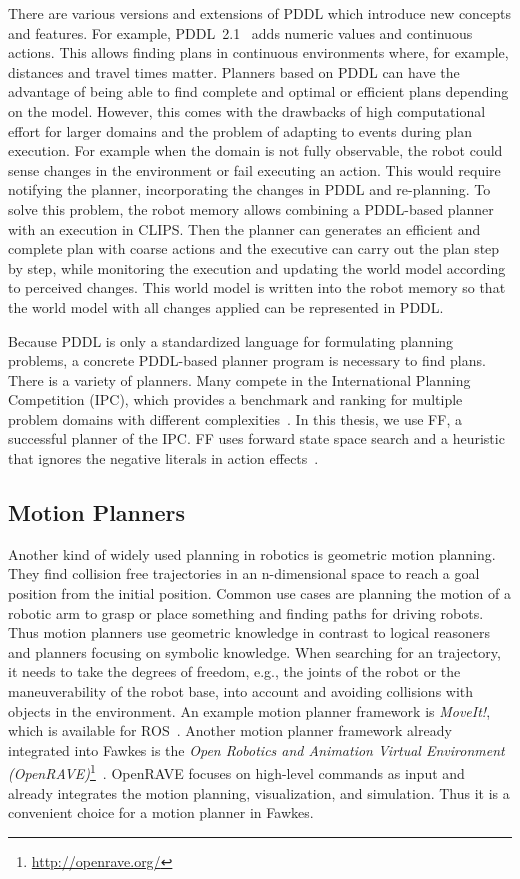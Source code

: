 There are various versions and extensions of PDDL which introduce new
concepts and features. For example, PDDL~2.1~\cite{PDDL2.1} adds
numeric values and continuous actions. This allows finding plans in
continuous environments where, for example, distances and travel times
matter. Planners based on PDDL can have the advantage of being able to find complete and
optimal or efficient plans depending on the model. However, this comes
with the drawbacks of high computational effort for larger domains and
the problem of adapting to events during plan execution. For example
when the domain is not fully observable, the robot could sense changes
in the environment or fail executing an action. This would require
notifying the planner, incorporating the changes in PDDL and
re-planning. To solve this problem, the robot memory allows
combining a PDDL-based planner with an execution in CLIPS. Then the
planner can generates an
efficient and complete plan with coarse actions and the executive can
carry out the plan step by step, while monitoring the execution and updating
the world model according to perceived changes. This world model is
written into the robot memory so that the world model with all changes
applied can be represented in PDDL.

Because PDDL is only a standardized language for formulating planning
problems, a concrete PDDL-based planner program is necessary to find plans. There
is a variety of planners. Many compete in the International
Planning Competition (IPC), which provides a benchmark and ranking for
multiple problem domains with different
complexities~\cite{planning-competition}. In this thesis, we use FF, a successful
planner of the IPC. FF uses
forward state space search and a heuristic that ignores the negative
literals in action effects~\cite{hoffmannFF}.

\subsection{Motion Planners}
Another kind of widely used planning in robotics is geometric motion
planning. They find collision free trajectories in an n-dimensional
space to reach a goal position from the initial position. Common use cases
are planning the motion of a robotic arm to grasp or place something
and finding paths for driving robots. Thus motion planners use geometric
knowledge in contrast to logical reasoners and planners focusing on
symbolic knowledge.  When searching for an trajectory, it needs to take the degrees of
freedom, e.g., the joints of the robot or the maneuverability of the
robot base, into account and avoiding collisions with objects in the
environment. An example motion planner framework is \emph{MoveIt!},
which is available for ROS~\cite{MoveIt}. Another motion planner
framework already integrated into Fawkes is the \emph{Open Robotics
  and Animation Virtual Environment
  (OpenRAVE)}\footnote{\url{http://openrave.org/}}~\cite{OpenRave}. OpenRAVE
focuses on high-level commands as input and already integrates the
motion planning, visualization, and simulation. Thus it is a
convenient choice for a motion planner in Fawkes.

